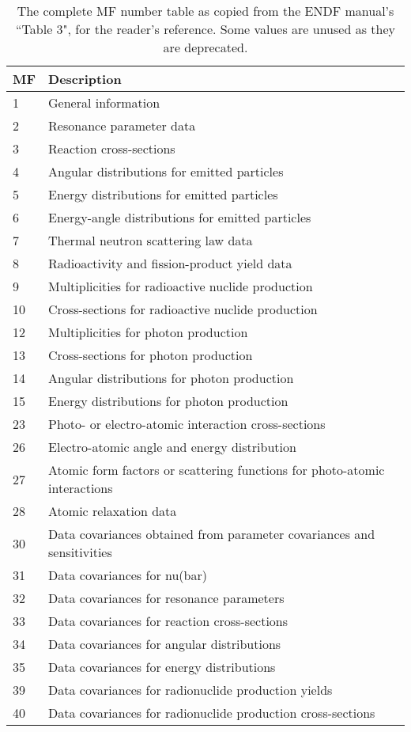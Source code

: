 \documentclass[a4paper, 12pt]{article}
\begin{document}
\begin{table}[H]
\centering
\begin{tabular}{ll}
MF&Description\\
\hline
1 &General information\\
2 &Resonance parameter data\\
3 &Reaction cross-sections\\
4 &Angular distributions for emitted particles\\
5 &Energy distributions for emitted particles\\
6 &Energy-angle distributions for emitted particles\\
7 &Thermal neutron scattering law data\\
8 &Radioactivity and fission-product yield data\\
9 &Multiplicities for radioactive nuclide production\\
10&Cross-sections for radioactive nuclide production\\
12&Multiplicities for photon production\\
13&Cross-sections for photon production\\
14&Angular distributions for photon production\\
15&Energy distributions for photon production\\
23&Photo- or electro-atomic interaction cross-sections\\
26&Electro-atomic angle and energy distribution\\
27&Atomic form factors or scattering functions for photo-atomic interactions\\
28&Atomic relaxation data\\
30&Data covariances obtained from parameter covariances and sensitivities\\
31&Data covariances for nu(bar)\\
32&Data covariances for resonance parameters\\
33&Data covariances for reaction cross-sections\\
34&Data covariances for angular distributions\\
35&Data covariances for energy distributions\\
39&Data covariances for radionuclide production yields\\
40&Data covariances for radionuclide production cross-sections
\end{tabular}
\caption{The complete MF number table as copied from the ENDF manual's ``Table 3"\cite{ENDFmanual}, for the reader's reference. Some values are unused as they are deprecated.}\label{MF table}
\end{table}
\end{document}
